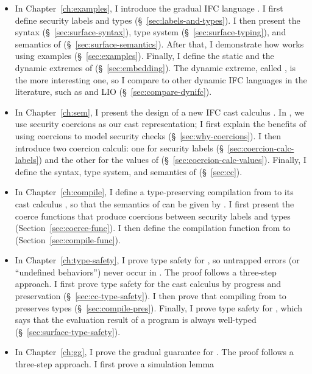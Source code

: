 {\begin{itemize}
  \item In Chapter~\ref{ch:examples}, I introduce the gradual IFC language
    \Surface. I first define security labels and types
    (\S~\ref{sec:labels-and-types}). I then present the syntax
    (\S~\ref{sec:surface-syntax}), type system (\S~\ref{sec:surface-typing}),
    and semantics of \Surface (\S~\ref{sec:surface-semantics}). After that, I
    demonstrate how \Surface works using examples (\S~\ref{sec:examples}).
    Finally, I define the static and the dynamic extremes of \Surface
    (\S~\ref{sec:embedding}). The dynamic extreme, called \DynIFC, is the more
    interesting one, so I compare \DynIFC to other dynamic IFC languages in the
    literature, such as \laminfo and LIO (\S~\ref{sec:compare-dynifc}).
  \item In Chapter~\ref{ch:sem}, I present the design of a new IFC cast calculus
    \CC. In \CC, we use security coercions as our cast representation; I first
    explain the benefits of using coercions to model security checks
    (\S~\ref{sec:why-coercions}). I then introduce two coercion calculi: one for
    security labels (\S~\ref{sec:coercion-calc-labels}) and the other for the
    values of \CC (\S~\ref{sec:coercion-calc-values}). Finally, I define the
    syntax, type system, and semantics of \CC (\S~\ref{sec:cc}).
  \item In Chapter~\ref{ch:compile}, I define a type-preserving compilation from
    \Surface to its cast calculus \CC, so that the semantics of \Surface can be
    given by \CC. I first present the coerce functions that produce coercions
    between security labels and types (Section~\ref{sec:coerce-func}). I then
    define the compilation function from \Surface to \CC
    (Section~\ref{sec:compile-func}).
  \item In Chapter~\ref{ch:type-safety}, I prove type safety for \Surface, so
    untrapped errors (or ``undefined behaviors'') never occur in \Surface. The
    proof follows a three-step approach. I first prove type safety for the cast
    calculus \CC by progress and preservation (\S~\ref{sec:cc-type-safety}). I
    then prove that compiling from \Surface to \CC preserves types
    (\S~\ref{sec:compile-pres}). Finally, I prove type safety for \Surface,
    which says that the evaluation result of a \Surface program is always
    well-typed (\S~\ref{sec:surface-type-safety}).
  \item In Chapter~\ref{ch:gg}, I prove the gradual guarantee for \Surface. The
    proof follows a three-step approach. I first prove a simulation lemma

\end{itemize}}
